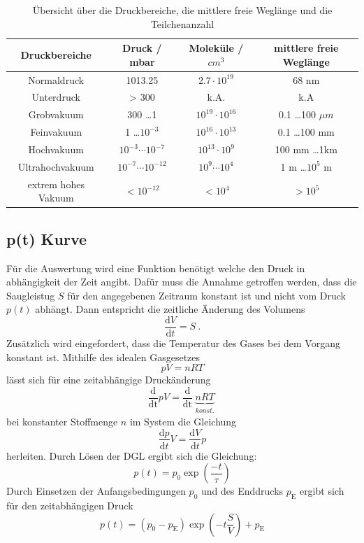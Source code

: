 \begin{table}
  \centering
  \caption{Übersicht über die Druckbereiche, die mittlere freie Weglänge und die Teilchenanzahl}
  \begin{tabular}{c|c c c}
  	\toprule
	Druckbereiche & Druck / mbar & Moleküle / $cm^3$ & mittlere freie Weglänge \\
	\midrule
	Normaldruck	& 1013.25			& $2.7 \cdot 10^{19}$ &	68 nm \\
	Unterdruck	& > 300				& k.A. & k.A \\
	Grobvakuum	& 300 \ldots 1 			&$10^{19} \cdot 10^{16}$&0.1 \ldots 100 $\mu m$ \\
	Feinvakuum	& 1 \ldots $10^{-3}$		& $10^{16} \cdot 10^{13}$ & 0.1 \ldots 100 mm \\
	Hochvakuum	& $10^{-3} \cdots 10^{-7}$	& $10^{13} \cdot 10^{9}$ & 100 mm \ldots 1km \\
	Ultrahochvakuum	& $10^{-7} \cdots 10^{-12}$	& $10^9 \cdots 10^4$ & 1 m \ldots $10^5$ m \\
	extrem hohes Vakuum & $< 10^{-12}$		& $<10^4$ & $> 10^5$ \\
	\bottomrule
  \end{tabular}
  \label{tab:ueberblick}
\end{table}
\subsection{p(t) Kurve}
Für die Auswertung wird eine Funktion benötigt welche den Druck in abhängigkeit der Zeit angibt. Dafür muss die Annahme getroffen werden, dass die Saugleistug $S$ für den angegebenen Zeitraum konstant ist und nicht vom Druck $p(t)$ abhängt. Dann entspricht die zeitliche Änderung des Volumens
\begin{equation}
  \frac{\text{d}V}{\text{d}t} = S \ .
\end{equation}
Zusätzlich wird eingefordert, dass die Temperatur des Gases bei dem Vorgang konstant ist. Mithilfe des idealen Gasgesetzes
\begin{equation}
  p V = n R T
\end{equation}
lässt sich für eine zeitabhängige Druckänderung
\begin{equation}
  \frac{\text{d}}{\text{dt}} pV = \frac{\text{d}}{\text{dt}} \underbrace{n R T}_{\substack{konst.}}
\end{equation}
bei konstanter Stoffmenge $n$ im System die Gleichung
\begin{equation}
  \frac{\text{d}p}{\text{d}t} V= \frac{\text{d}V}{\text{d}t} p
  \label{eqn:konti}
\end{equation}
herleiten. Durch Lösen der DGL ergibt sich die Gleichung:
\begin{equation}
  p(t) = p_0 \exp \left( \frac{-t}{\tau} \right)
\end{equation}
Durch Einsetzen der Anfangsbedingungen $p_0$ und des Enddrucks $p_\text{E}$ ergibt sich für den zeitabhängigen Druck
\begin{equation}
  p(t) = (p_0 - p_\text{E}) \exp \left( -t \frac{S}{V} \right) + p_\text{E}
  \label{eqn:Druck}
\end{equation}
